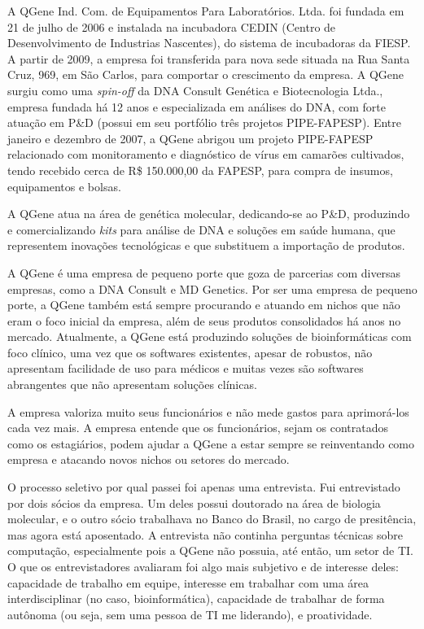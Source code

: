 A QGene Ind. Com. de Equipamentos Para Laboratórios. Ltda. foi fundada em 21 de julho de 2006 e instalada 
na incubadora CEDIN (Centro de Desenvolvimento de Industrias Nascentes), do sistema de incubadoras da 
FIESP. A partir de 2009, a empresa foi transferida para nova sede situada na Rua Santa Cruz, 969, em São Carlos, 
para comportar o crescimento da empresa. A QGene surgiu como uma \textit{spin-off} da DNA Consult Genética e
Biotecnologia Ltda., empresa fundada há 12 anos e especializada em análises do DNA, com forte atuação em P&D
(possui em seu portfólio três projetos PIPE-FAPESP). Entre janeiro e dezembro de 2007, a QGene abrigou um 
projeto PIPE-FAPESP relacionado com monitoramento e diagnóstico de vírus em camarões cultivados, tendo 
recebido cerca de R\$ 150.000,00 da FAPESP, para compra de insumos, equipamentos e bolsas.

A QGene atua na área de genética molecular, dedicando-se ao P&D, produzindo e comercializando \textit{kits} para 
análise de DNA e soluções em saúde humana, que representem inovações tecnológicas e que substituem a 
importação de produtos.

A QGene é uma empresa de pequeno porte que goza de parcerias com diversas empresas, como a DNA Consult e MD Genetics.
Por ser uma empresa de pequeno porte, a QGene também está sempre procurando e atuando em nichos que não
eram o foco inicial da empresa, além de seus produtos consolidados há anos no mercado. Atualmente, a QGene
está produzindo soluções de bioinformáticas com foco clínico, uma vez que os softwares existentes, apesar
de robustos, não apresentam facilidade de uso para médicos e muitas vezes são softwares abrangentes
que não apresentam soluções clínicas.

A empresa valoriza muito seus funcionários e não mede gastos para aprimorá-los cada vez mais. A empresa entende
que os funcionários, sejam os contratados como os estagiários, podem ajudar a QGene a estar sempre se reinventando
como empresa e atacando novos nichos ou setores do mercado.

O processo seletivo por qual passei foi apenas uma entrevista. Fui entrevistado por dois sócios da empresa. Um deles
possui doutorado na área de biologia molecular, e o outro sócio trabalhava no Banco do Brasil, no cargo de presitência,
mas agora está aposentado. A entrevista não continha perguntas técnicas sobre computação, especialmente pois a QGene não
possuia, até então, um setor de TI. O que os entrevistadores avaliaram foi algo mais subjetivo e de interesse deles:
capacidade de trabalho em equipe, interesse em trabalhar com uma área interdisciplinar (no caso, bioinformática),
capacidade de trabalhar de forma autônoma (ou seja, sem uma pessoa de TI me liderando), e proatividade.

